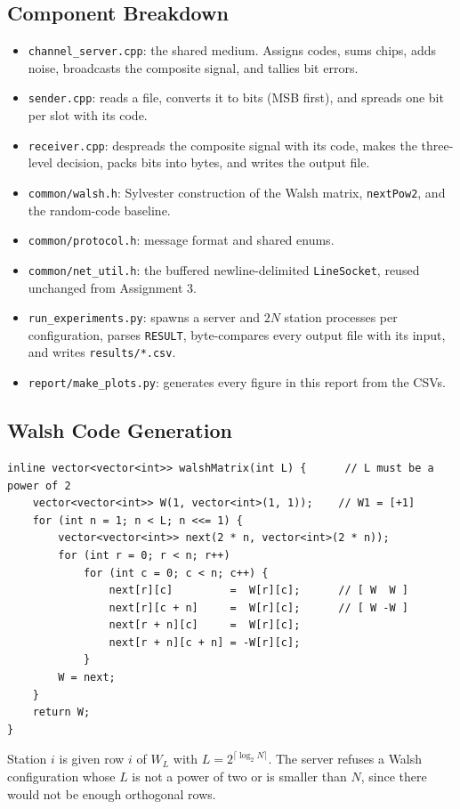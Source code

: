 \documentclass[11pt]{article}
\begin{document}
\subsection{Component Breakdown}
\begin{itemize}[leftmargin=1.6em]
  \item \texttt{channel\_server.cpp}: the shared medium. Assigns codes, sums chips, adds
  noise, broadcasts the composite signal, and tallies bit errors.
  \item \texttt{sender.cpp}: reads a file, converts it to bits (MSB first), and spreads one
  bit per slot with its code.
  \item \texttt{receiver.cpp}: despreads the composite signal with its code, makes the
  three-level decision, packs bits into bytes, and writes the output file.
  \item \texttt{common/walsh.h}: Sylvester construction of the Walsh matrix,
  \texttt{nextPow2}, and the random-code baseline.
  \item \texttt{common/protocol.h}: message format and shared enums.
  \item \texttt{common/net\_util.h}: the buffered newline-delimited \texttt{LineSocket},
  reused unchanged from Assignment 3.
  \item \texttt{run\_experiments.py}: spawns a server and $2N$ station processes per
  configuration, parses \texttt{RESULT}, byte-compares every output file with its input,
  and writes \texttt{results/*.csv}.
  \item \texttt{report/make\_plots.py}: generates every figure in this report from the CSVs.
\end{itemize}

\subsection{Walsh Code Generation}
\begin{lstlisting}
inline vector<vector<int>> walshMatrix(int L) {      // L must be a power of 2
    vector<vector<int>> W(1, vector<int>(1, 1));    // W1 = [+1]
    for (int n = 1; n < L; n <<= 1) {
        vector<vector<int>> next(2 * n, vector<int>(2 * n));
        for (int r = 0; r < n; r++)
            for (int c = 0; c < n; c++) {
                next[r][c]         =  W[r][c];      // [ W  W ]
                next[r][c + n]     =  W[r][c];      // [ W -W ]
                next[r + n][c]     =  W[r][c];
                next[r + n][c + n] = -W[r][c];
            }
        W = next;
    }
    return W;
}
\end{lstlisting}
Station $i$ is given row $i$ of $W_L$ with $L = 2^{\lceil\log_2 N\rceil}$. The server
refuses a Walsh configuration whose $L$ is not a power of two or is smaller than $N$, since
there would not be enough orthogonal rows.
\end{document}
